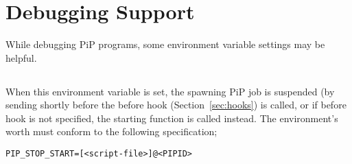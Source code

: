 
\section{Debugging Support}

While debugging PiP programs, some environment variable settings may
be helpful.  

\subsection{}

When this environment variable is set, the spawning PiP job is
suspended (by sending  shortly before the before
hook (Section~\ref{sec:hooks}) is called, or if before hook is not
specified, the starting function is called instead. The environment's
worth must conform to the following specification;

\begin{lstlisting}[frame=tb]
  PIP_STOP_START=[<script-file>]@<PIPID>
\end{lstlisting}

